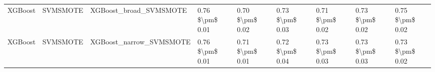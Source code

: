 \begin{tabular}{lllllllll}
                        XGBoost &                      SVMSMOTE &                       XGBoost\_broad\_SVMSMOTE &     0.76 \$\textbackslash pm\$ 0.01 &           0.70 \$\textbackslash pm\$ 0.02 &       0.73 \$\textbackslash pm\$ 0.03 &        0.71 \$\textbackslash pm\$ 0.02 &                         0.73 \$\textbackslash pm\$ 0.02 & 0.75 \$\textbackslash pm\$ 0.02 \\
                        XGBoost &                      SVMSMOTE &                      XGBoost\_narrow\_SVMSMOTE &     0.76 \$\textbackslash pm\$ 0.01 &           0.71 \$\textbackslash pm\$ 0.01 &       0.72 \$\textbackslash pm\$ 0.04 &        0.73 \$\textbackslash pm\$ 0.03 &                         0.73 \$\textbackslash pm\$ 0.03 & 0.73 \$\textbackslash pm\$ 0.02 \\
\bottomrule
\end{tabular}
